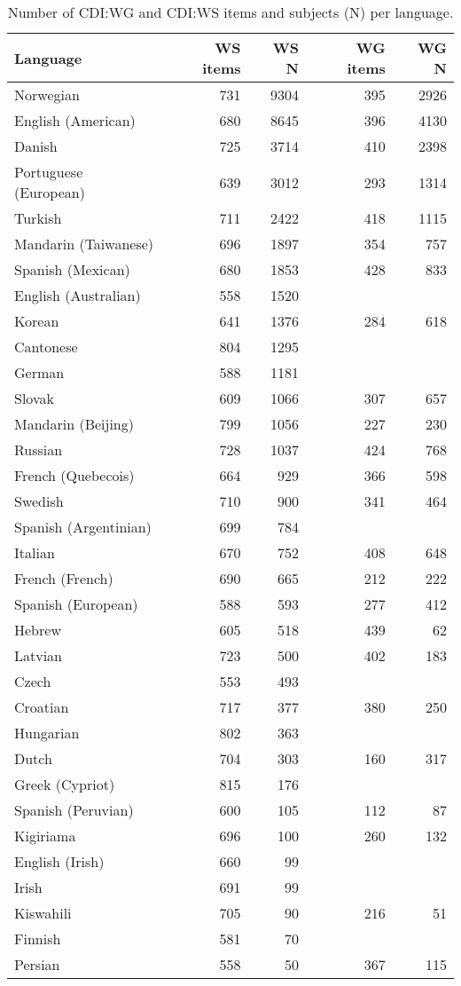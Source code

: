 \documentclass[10pt, letterpaper]{article}
\begin{document}
\begin{table}[H]
\centering
\begin{tabular}{lrrrr}
  \hline
Language & WS items & WS N & WG items & WG N \\ 
  \hline
Norwegian & 731 & 9304 & 395 & 2926 \\ 
  English (American) & 680 & 8645 & 396 & 4130 \\ 
  Danish & 725 & 3714 & 410 & 2398 \\ 
  Portuguese (European) & 639 & 3012 & 293 & 1314 \\ 
  Turkish & 711 & 2422 & 418 & 1115 \\ 
  Mandarin (Taiwanese) & 696 & 1897 & 354 & 757 \\ 
  Spanish (Mexican) & 680 & 1853 & 428 & 833 \\ 
  English (Australian) & 558 & 1520 &  &  \\ 
  Korean & 641 & 1376 & 284 & 618 \\ 
  Cantonese & 804 & 1295 &  &  \\ 
  German & 588 & 1181 &  &  \\ 
  Slovak & 609 & 1066 & 307 & 657 \\ 
  Mandarin (Beijing) & 799 & 1056 & 227 & 230 \\ 
  Russian & 728 & 1037 & 424 & 768 \\ 
  French (Quebecois) & 664 & 929 & 366 & 598 \\ 
  Swedish & 710 & 900 & 341 & 464 \\ 
  Spanish (Argentinian) & 699 & 784 &  &  \\ 
  Italian & 670 & 752 & 408 & 648 \\ 
  French (French) & 690 & 665 & 212 & 222 \\ 
  Spanish (European) & 588 & 593 & 277 & 412 \\ 
  Hebrew & 605 & 518 & 439 & 62 \\ 
  Latvian & 723 & 500 & 402 & 183 \\ 
  Czech & 553 & 493 &  &  \\ 
  Croatian & 717 & 377 & 380 & 250 \\ 
  Hungarian & 802 & 363 &  &  \\ 
  Dutch & 704 & 303 & 160 & 317 \\ 
  Greek (Cypriot) & 815 & 176 &  &  \\ 
  Spanish (Peruvian) & 600 & 105 & 112 & 87 \\ 
  Kigiriama & 696 & 100 & 260 & 132 \\ 
  English (Irish) & 660 & 99 &  &  \\ 
  Irish & 691 & 99 &  &  \\ 
  Kiswahili & 705 & 90 & 216 & 51 \\ 
  Finnish & 581 & 70 &  &  \\ 
  Persian & 558 & 50 & 367 & 115 \\ 
   \hline
\end{tabular}
\caption{Number of CDI:WG and CDI:WS items and subjects (N) per language.} 
\end{table}
\end{document}
